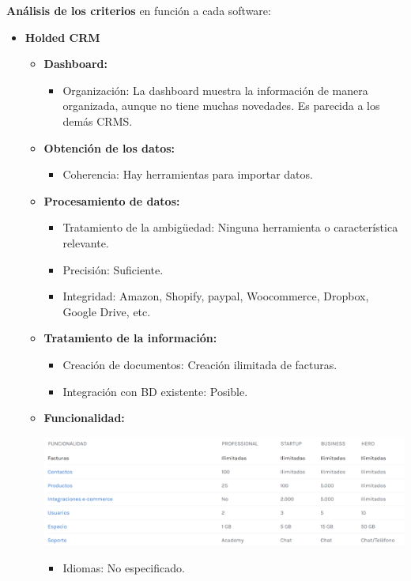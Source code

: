 \documentclass{article}
\begin{document}
\textbf{Análisis de los criterios} en función a cada software:

\begin{itemize}
\item \textbf{Holded CRM}
\begin{itemize}
\item \textbf{Dashboard:} 
\begin{itemize}
\item Organización: La dashboard muestra la información de manera organizada, aunque no tiene muchas novedades. Es parecida a los demás CRMS. 
\end{itemize}
\item \textbf{Obtención de los datos:}
\begin{itemize}
\item Coherencia: Hay herramientas para importar datos. 
\end{itemize}
\item \textbf{Procesamiento de datos:}
\begin{itemize}
\item Tratamiento de la ambigüedad: Ninguna herramienta o característica relevante. 
\item Precisión: Suficiente.          
\item Integridad: Amazon, Shopify, paypal, Woocommerce, Dropbox, Google Drive, etc.
\end{itemize}
\item \textbf{Tratamiento de la información:}
\begin{itemize}
\item Creación de documentos: Creación ilimitada de facturas. 
\item Integración con BD existente: Posible. 
\end{itemize}
\item \textbf{Funcionalidad:}
\begin{center}
\includegraphics[scale=0.5]{images/func1.png}
\end{center}
\begin{itemize}
\item Idiomas: No especificado. 

\end{itemize}
\end{itemize}
\end{itemize}
\end{document}
